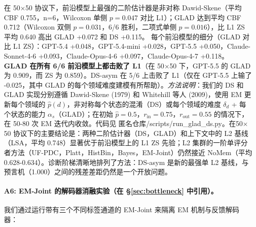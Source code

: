 \documentclass[11pt,a4paper,fontset=fandol]{ctexart}
\begin{document}
在 50$\times$50 协议下，前沿模型上最强的二阶估计器是非对称 Dawid-Skene（平均 CBF 0.755，n=6，Wilcoxon 单侧 $p=0.047$ 对比 L1）；GLAD 达到平均 CBF 0.712（Wilcoxon 双侧 $p=0.031$，6/6 胜利，二项式单侧 $p=0.016$），比 L1 ZS 平均 0.640 高出 GLAD +0.072 和 DS +0.115。 每个前沿模型的细分（GLAD 对比 L1 ZS）：GPT-5.4 +0.048，GPT-5.4-mini +0.028，GPT-5.5 +0.050，Claude-Sonnet-4-6 +0.093，Claude-Opus-4-6 +0.097，Claude-Opus-4-7 +0.118。 \textbf{GLAD 在所有 6/6 前沿模型上都击败了 L1}（在 50$\times$50 下，GPT-5.5 的 GLAD 为 0.909，而 ZS 为 0.859）。DS-asym 在 5/6 上击败了 L1（仅在 GPT-5.5 上输了 -0.025，其中 GLAD 的每个领域难度建模有所帮助）。\emph{方法说明}：我们的 DS 和 GLAD 实现分别遵循 Dawid-Skene (1979) 和 Whitehill 等人 (2009)，使用 EM 更新每个领域的 $\hat p(d)$，非对称每个状态的混淆（DS）或每个领域的难度 $\delta_d$ + 每个状态的能力 $\alpha_s$（GLAD）；在初始 $\hat p=0.5$，$r_{\text{in}}=0.75$，$r_{\text{out}}=0.55$ 的情况下，在 50-80 次 EM 迭代内收敛。代码见 匿名仓库/scripts/run\_glad\_ds.py。在50$\times$50 协议下的主要结论是：两种二阶估计器（DS，GLAD）和上下文中的 L2 基线（LSA，平均 0.748）显著优于前沿模型上的 L1 ZS 先验；L2 集群的一阶单评分者方法（UF-PDC，Platt，HistBin，Bayes，EM-Joint）仍然接近 NoMem（平均 0.628-0.634）。诊断阶梯清晰地排列了方法：DS-asym 是新的最强单 L2 基线，与预言机（1.000）之间的残差差距仍然是一个开放问题。

\paragraph{A6: EM-Joint 的解码器消融实验（在 \S\ref{sec:bottleneck} 中引用）。}
\label{app:decoder_ablation}
我们通过运行带有三个不同标签通道的 EM-Joint 来隔离 EM 机制与反馈解码器：
\end{document}
